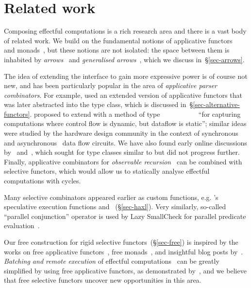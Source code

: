\section{Related work}\label{sec-related}

Composing effectful computations is a rich research area and there is a vast
body of related work. We build on the fundamental notions of applicative
functors~\citep{mcbride2008applicative} and
monads~\citep{moggi1991notions,1995_wadler_monads}, but these notions are not
isolated: the space between them is inhabited by
\emph{arrows}~\citep{hughes2000arrows} and \emph{generalised
arrows}~\citep{megacz2011hardware}, which we discuss in~\S\ref{sec-arrows}.

The idea of extending the  interface to gain more expressive
power is of course not new, and has been particularly popular in
the area of \emph{applicative parser combinators}. For example,
\citet{swierstra1996parsers} used an extended version of applicative functors
that was later abstracted into the  type class, which is
discussed in~\S\ref{sec-alternative-functors}. \citet{yallop2010phd} proposed
to extend  with a method of type
~~\hs{->}~~~\hs{->}~~~\hs{->}~~
``for capturing computations where control flow is dynamic, but dataflow is
static''; similar ideas were studied by the hardware design community in the
context of synchronous~\citep{dennis1975preliminary} and
asynchronous~\citep{mokhov2009cpog,sokolov2018reconfigurable} data flow
circuits. We have also found early online discussions by~\citet{yorgey2009irc}
and~\citet{permyakov2012irc}, which sought for type classes similar to
 but did not progress further. Finally, applicative combinators
for \emph{observable recursion}~\citep{devriese2012finally,devriese2013fixing}
can be combined with selective functors, which would allow us to statically
analyse effectful computations with cycles.

Many selective combinators appeared earlier as custom functions, e.g.
\Haxl's speculative execution functions  and
~(\S\ref{sec-haxl}). Very similarly, so-called ``parallel conjunction''
operator \hs{*&*} is used by Lazy SmallCheck for parallel predicate
evaluation~\citep{runciman2008smallcheck}.

Our free construction for rigid selective functors~(\S\ref{sec-free}) is
inspired by the works on free applicative functors~\citep{free-applicatives},
free monads~\citep{swierstra2008data}, and insightful blog posts
by~\citet{fancher2016free,fancher2017static}. \emph{Batching and remote
execution} of effectful computations~\citep{gill2015remote} can be greatly
simplified by using free applicative functors, as
demonstrated by~\citet{gibbons2016free}, and we believe that free selective
functors uncover new opportunities in this area.


